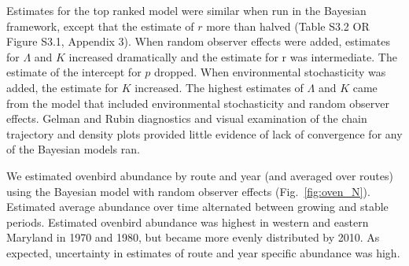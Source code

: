 \documentclass[12pt]{article}
\begin{document}
Estimates for the top ranked model %
were similar when
run in the Bayesian framework, except that the estimate of $r$
more than halved (Table S3.2 OR Figure S3.1, Appendix 3). %
When random observer effects
were added, estimates for $\Lambda$ and $K$ increased dramatically
and the estimate for r was intermediate. The %
estimate of the intercept for $p$ dropped. %
When environmental stochasticity was added, the estimate for $K$ increased. %
The highest estimates of $\Lambda$ and $K$ came 
from the model that included environmental stochasticity and random observer effects. %
Gelman and Rubin diagnostics and visual examination of the chain trajectory and density plots
provided little evidence of lack of convergence for any of the Bayesian models ran.  

We estimated ovenbird abundance by route and year (and averaged over routes) 
using the Bayesian model with random observer effects (Fig.~\ref{fig:oven_N}).  
Estimated average abundance over time alternated between growing and stable periods.  
Estimated ovenbird
abundance was highest in western and eastern Maryland in 1970 and 1980, but became
more evenly distributed by 2010.  
As expected, uncertainty in estimates of route and year specific abundance was high.
\end{document}
